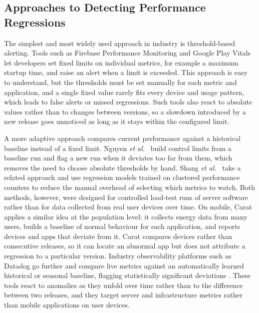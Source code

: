 \subsection{Approaches to Detecting Performance Regressions}

The simplest and most widely used approach in industry is threshold-based alerting. Tools such as Firebase Performance Monitoring \cite{FirebasePerf} and Google Play Vitals \cite{GooglePlayVitals} let developers set fixed limits on individual metrics, for example a maximum startup time, and raise an alert when a limit is exceeded. This approach is easy to understand, but the thresholds must be set manually for each metric and application, and a single fixed value rarely fits every device and usage pattern, which leads to false alerts or missed regressions. Such tools also react to absolute values rather than to changes between versions, so a slowdown introduced by a new release goes unnoticed as long as it stays within the configured limit.

A more adaptive approach compares current performance against a historical baseline instead of a fixed limit. Nguyen \emph{et al.}~\cite{Nguyen2012} build control limits from a baseline run and flag a new run when it deviates too far from them, which removes the need to choose absolute thresholds by hand. Shang \emph{et al.}~\cite{Shang2015} take a related approach and use regression models trained on clustered performance counters to reduce the manual overhead of selecting which metrics to watch. Both methods, however, were designed for controlled load-test runs of server software rather than for data collected from real user devices over time. On mobile, Carat \cite{Carat} applies a similar idea at the population level: it collects energy data from many users, builds a baseline of normal behaviour for each application, and reports devices and apps that deviate from it. Carat compares devices rather than consecutive releases, so it can locate an abnormal app but does not attribute a regression to a particular version. Industry observability platforms such as Datadog go further and compare live metrics against an automatically learned historical or seasonal baseline, flagging statistically significant deviations \cite{Datadog}. These tools react to anomalies as they unfold over time rather than to the difference between two releases, and they target server and infrastructure metrics rather than mobile applications on user devices.


